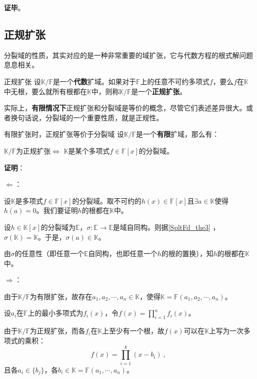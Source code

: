 \textbf{证毕}。




\subsection{正规扩张}

分裂域的性质，其实对应的是一种非常重要的域扩张，它与代数方程的根式解问题息息相关。

\begin{definition}{正规扩张}
设$\mathbb{K}/\mathbb{F}$是一个\textbf{代数}扩域。如果对于$\mathbb{F}$上的任意不可约多项式$f$，要么$f$在$\mathbb{K}$中无根，要么就所有根都在$\mathbb{K}$中，则称$\mathbb{K}/\mathbb{F}$是一个\textbf{正规扩张}。
\end{definition}

实际上，\textbf{有限情况下}正规扩张和分裂域是等价的概念，尽管它们表述差异很大。或者换句话说，分裂域的一个重要性质，就是正规性。


\begin{theorem}{有限扩张时，正规扩张等价于分裂域}\label{SpltFd_the2}
设$\mathbb{K}/\mathbb{F}$是一个\textbf{有限}扩域，那么有：

$\mathbb{K}/\mathbb{F}$为正规扩张$\iff$ $\mathbb{K}$是某个多项式$f\in\mathbb{F}[x]$的分裂域。
\end{theorem}

\textbf{证明}：

$\Leftarrow$：

设$\mathbb{K}$是多项式$f\in\mathbb{F}[x]$的分裂域。取不可约的$h(x)\in\mathbb{F}[x]$且$\exists a\in\mathbb{K}$使得$h(a)=0$。我们要证明$h$的根都在$\mathbb{K}$中。


设$h\in\mathbb{K}[x]$的分裂域为$\mathbb{E}$，$\sigma:\mathbb{E}\to\mathbb{E}$是域自同构。则据\autoref{SpltFd_the3} ，$\sigma(\mathbb{K})=\mathbb{K}$。于是，$\sigma(a)\in\mathbb{K}$。

由$\sigma$的任意性（即任意一个$\mathbb{E}$自同构，也即任意一个$h$的根的置换），知$h$的根都在$\mathbb{K}$中。



$\Rightarrow$：

由于$\mathbb{K}/\mathbb{F}$为有限扩张，故存在$a_1, a_2, \cdots, a_n\in \mathbb{K}$，使得$\mathbb{K}=\mathbb{F}(a_1, a_2, \cdots, a_n)$。

设$a_i$在$\mathbb{F}$上的最小多项式为$f_i(x)$，令$f(x)=\prod_{i=1}^n f_i(x)$。

由于$\mathbb{K}/\mathbb{F}$为正规扩张，而各$f_i$在$\mathbb{K}$上至少有一个根，故$f(x)$可以在$\mathbb{K}$上写为一次多项式的乘积：
\begin{equation}
f(x) = \prod_{i=1}^k (x-b_i)~,
\end{equation}
且各$a_i\in\{b_j\}$，各$b_i\in\mathbb{K}=\mathbb{F}(a_1, \cdots, a_n)$。

